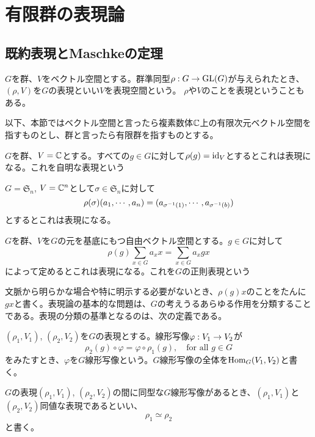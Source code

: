 \documentclass{ltjsreport}
\begin{document}
\section{有限群の表現論}
\subsection{既約表現とMaschkeの定理}

\begin{defin}
  $G$を群、$V$をベクトル空間とする。群準同型$\rho:G\rightarrow\mathrm{GL}(G)$が与えられたとき、$(\rho,V)$を$G$の表現といい$V$を表現空間という。
  $\rho$や$V$のことを表現ということもある。
\end{defin} 

以下、本節ではベクトル空間と言ったら複素数体$\mathbb{C}$上の有限次元ベクトル空間を指すものとし、群と言ったら有限群を指すものとする。

\begin{eg}
  $G$を群、$V=\mathbb{C}$とする。すべての$g\in G$に対して$\rho(g)=\text{id}_{V}$とするとこれは表現になる。これを自明な表現という
\end{eg}

\begin{eg}\label{natural}
  $G=\mathfrak{S}_n$, $V=\mathbb{C}^n$として$\sigma\in\mathfrak{S}_n$に対して
  \[
  \rho(\sigma)(a_1,\cdots,a_n)=(a_{\sigma^{-1}(1)},\cdots,a_{\sigma^{-1}(b)})  
  \]
  とするとこれは表現になる。
\end{eg}

\begin{eg}\label{regular}
  $G$を群、$V$を$G$の元を基底にもつ自由ベクトル空間とする。$g\in G$に対して
  \[
  \rho(g)\sum_{x\in G}a_xx=\sum_{x\in G}a_xgx  
  \]
  によって定めるとこれは表現になる。これを$G$の正則表現という
\end{eg}

文脈から明らかな場合や特に明示する必要がないとき、$\rho(g)x$のことをたんに$gx$と書く。表現論の基本的な問題は、$G$の考えうるあらゆる作用を分類することである。表現の分類の基準となるのは、次の定義である。

\begin{defin}
  $(\rho_1,V_1)$, $(\rho_2,V_2)$を$G$の表現とする。線形写像$\varphi:V_1\rightarrow V_2$が
  \[
  \rho_2(g)\circ\varphi=\varphi\circ\rho_1(g),\quad \text{for all $g\in G$}
  \]
  をみたすとき、$\varphi$を$G$線形写像という。$G$線形写像の全体を$\text{Hom}_G(V_1,V_2)$と書く。
\end{defin}

\begin{defin}
  $G$の表現$(\rho_1,V_1)$, $(\rho_2,V_2)$の間に同型な$G$線形写像があるとき、$(\rho_1,V_1)$と$(\rho_2,V_2)$同値な表現であるといい、
  \[
  \rho_1\simeq\rho_2  
  \]
  と書く。
\end{defin}
\end{document}
